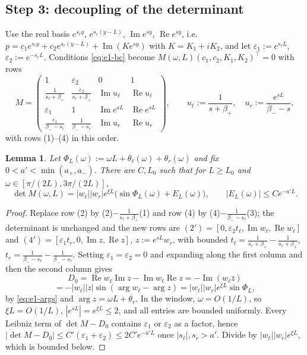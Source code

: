 \documentclass[11pt,a4paper]{article}
\newtheorem{lemma}[theorem]{Lemma}
\theoremstyle{definition}
\theoremstyle{remark}
\newcommand{\1}{\mathbf 1}
\begin{document}
\subsection*{Step 3: decoupling of the determinant}

Use the real basis $e^{s_\ell y}$, $e^{s_r(y-L)}$, $\operatorname{Im}e^{sy}$, $\operatorname{Re}e^{sy}$,
i.e.\ $p=c_1e^{s_\ell y}+c_2e^{s_r(y-L)}+\operatorname{Im}(Ke^{sy})$ with $K=K_1+iK_2$, and let
$\varepsilon_1:=e^{s_\ell L}$, $\varepsilon_2:=e^{-s_rL}$. Conditions \eqref{eq:e1-bc} become
$M(\omega,L)(c_1,c_2,K_1,K_2)^{\top}=0$ with rows
\[
M=\begin{pmatrix}
1&\varepsilon_2&0&1\\
\frac1{s_\ell+\beta_+}&\frac{\varepsilon_2}{s_r+\beta_+}&\operatorname{Im}u_\ell&\operatorname{Re}u_\ell\\
\varepsilon_1&1&\operatorname{Im}e^{sL}&\operatorname{Re}e^{sL}\\
\frac{\varepsilon_1}{\beta_--s_\ell}&\frac1{\beta_--s_r}&\operatorname{Im}u_r&\operatorname{Re}u_r
\end{pmatrix},\qquad u_\ell:=\frac1{s+\beta_+},\quad u_r:=\frac{e^{sL}}{\beta_--s},
\]
with rows (1)--(4) in this order.
\begin{lemma}\label{lem:e1-det}
Let $\Phi_L(\omega):=\omega L+\theta_\ell(\omega)+\theta_r(\omega)$ and fix
$0<a'<\min(a_+,a_-)$. There are $C,L_0$ such that for $L\ge L_0$ and
$\omega\in[\pi/(2L),3\pi/(2L)]$,
\[
\det M(\omega,L)=|w_\ell||w_r|e^{\xi L}\bigl(\sin\Phi_L(\omega)+E_L(\omega)\bigr),\qquad |E_L(\omega)|\le Ce^{-a'L}.
\]
\end{lemma}

\begin{proof}
Replace row (2) by (2)$-\frac1{s_\ell+\beta_+}$(1) and row (4) by
(4)$-\frac1{\beta_--s_r}$(3); the determinant is unchanged and the new rows are
$(2')=[0,\varepsilon_2t_\ell,\operatorname{Im}w_\ell,\operatorname{Re}w_\ell]$ and
$(4')=[\varepsilon_1t_r,0,\operatorname{Im}z,\operatorname{Re}z]$, $z:=e^{sL}w_r$, with bounded
$t_\ell=\frac1{s_r+\beta_+}-\frac1{s_\ell+\beta_+}$, $t_r=\frac1{\beta_--s_\ell}-\frac1{\beta_--s_r}$.
Setting $\varepsilon_1=\varepsilon_2=0$ and expanding along the first column and then the
second column gives
\[
D_0=\operatorname{Re}w_\ell\operatorname{Im}z-\operatorname{Im}w_\ell\operatorname{Re}z=-\operatorname{Im}(w_\ell\bar z)
\]
\[
=-|w_\ell||z|\sin(\arg w_\ell-\arg z)=|w_\ell||w_r|e^{\xi L}\sin\Phi_L ,
\]
by \eqref{eq:e1-args} and $\arg z=\omega L+\theta_r$. In the window, $\omega=O(1/L)$, so
$\xi L=O(1/L)$, $|e^{sL}|=e^{\xi L}\le2$, and all entries are bounded uniformly. Every
Leibniz term of $\det M-D_0$ contains $\varepsilon_1$ or $\varepsilon_2$ as a factor,
hence $|\det M-D_0|\le C'(\varepsilon_1+\varepsilon_2)\le 2C'e^{-a'L}$ once $|s_\ell|,s_r>a'$.
Divide by $|w_\ell||w_r|e^{\xi L}$, which is bounded below.
\end{proof}
\end{document}
